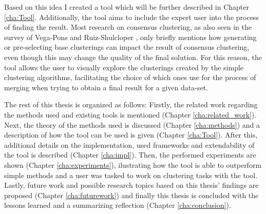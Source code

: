 Based on this idea I created a tool which will be further described in Chapter \ref{cha:Tool}. Additionally, the tool aims to include the expert user into the process of finding the result. Most research on consensus clustering, as also seen in the survey of Vega-Pons and Ruiz-Shulcloper \cite{survey1}, only briefly mentions how generating or pre-selecting base clusterings can impact the result of consensus clustering, even though this may change the quality of the final solution. For this reason, the tool allows the user to visually explore the clusterings created by the simple clustering algorithms, facilitating the choice of which ones use for the process of merging when trying to obtain a final result for a given data-set.

The rest of this thesis is organized as follows: Firstly, the related work regarding the methods used and existing tools is mentioned (Chapter \ref{cha:related_work}). Next, the theory of the methods used is discussed (Chapter \ref{cha:methods}) and a description of how the tool can be used is given (Chapter \ref{cha:Tool}). After this, additional details on the implementation, used frameworks and extendability of the tool is described (Chapter \ref{cha:impl}). Then, the performed experiments are shown (Chapter \ref{cha:experiments}), ilustrating how the tool is able to outperform simple methods and a user was tasked to work on clustering tasks with the tool. Lastly, future work and possible research topics based on this thesis' findings are proposed (Chapter \ref{cha:futurework}) and finally this thesis is concluded with the lessons learned and a summarizing reflection (Chapter \ref{cha:conclusion}).
